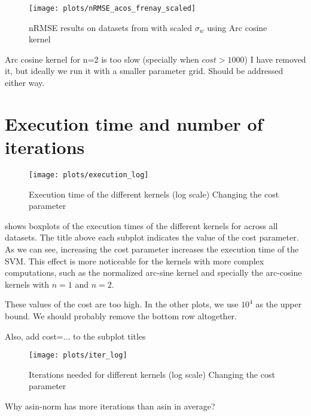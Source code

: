 \begin{figure}[H]
    \texttt{[image: plots/nRMSE\_acos\_frenay\_scaled]}
    \caption{nRMSE results on datasets from \cite{frenayParameterinsensitiveKernelExtreme2011} with
        scaled $\sigma_w$ using Arc cosine kernel}%
    \label{fig:nrmse-acos-frenay-scaled}
\end{figure}

\begin{cnote}
    Arc cosine kernel for n=2 is too slow (specially when $cost>1000$)
    I have removed it, but ideally we run it with a smaller parameter grid.
    Should be addressed either way.
\end{cnote}


\section{Execution time and number of iterations}%
\label{sec:execution-time-and-number-of-iterations}

\begin{figure}[H]
    \texttt{[image: plots/execution\_log]}
    \caption{Execution time of the different kernels (log scale) Changing the cost
        parameter}%
    \label{fig:execution-log}
\end{figure}

 shows boxplots of the execution times of the different
kernels for across all datasets. The title above each subplot indicates the
value of the cost parameter. As we can see, increasing the cost parameter
increases the execution time of the SVM. This effect is more noticeable for the
kernels with more complex computations, such as the normalized arc-sine kernel
and specially the arc-cosine kernels with $n=1$ and $n=2$.

\begin{cnote}
    These values of the cost are too high.
    In the other plots, we use $10^4$ as the upper bound.
    We should probably remove the bottom row altogether.

    Also, add cost=... to the subplot titles
\end{cnote}

\begin{figure}[H]
    \texttt{[image: plots/iter\_log]}
    \caption{Iterations needed for different kernels (log scale) Changing the cost
        parameter}
\end{figure}

\begin{cnote}
    Why asin-norm has more iterations than asin in average?
\end{cnote}

